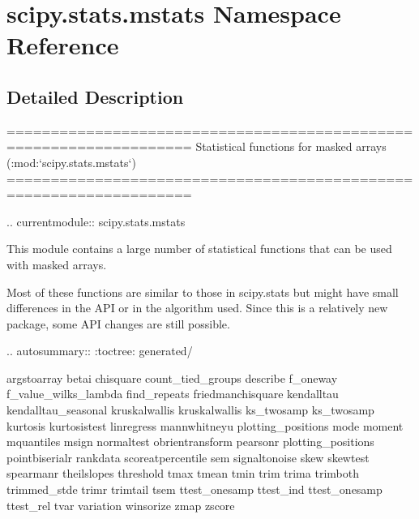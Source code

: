 \hypertarget{namespacescipy_1_1stats_1_1mstats}{}\section{scipy.\+stats.\+mstats Namespace Reference}
\label{namespacescipy_1_1stats_1_1mstats}


\subsection{Detailed Description}
\begin{DoxyVerb}===================================================================
Statistical functions for masked arrays (:mod:`scipy.stats.mstats`)
===================================================================

.. currentmodule:: scipy.stats.mstats

This module contains a large number of statistical functions that can
be used with masked arrays.

Most of these functions are similar to those in scipy.stats but might
have small differences in the API or in the algorithm used. Since this
is a relatively new package, some API changes are still possible.

.. autosummary::
   :toctree: generated/

   argstoarray
   betai
   chisquare
   count_tied_groups
   describe
   f_oneway
   f_value_wilks_lambda
   find_repeats
   friedmanchisquare
   kendalltau
   kendalltau_seasonal
   kruskalwallis
   kruskalwallis
   ks_twosamp
   ks_twosamp
   kurtosis
   kurtosistest
   linregress
   mannwhitneyu
   plotting_positions
   mode
   moment
   mquantiles
   msign
   normaltest
   obrientransform
   pearsonr
   plotting_positions
   pointbiserialr
   rankdata
   scoreatpercentile
   sem
   signaltonoise
   skew
   skewtest
   spearmanr
   theilslopes
   threshold
   tmax
   tmean
   tmin
   trim
   trima
   trimboth
   trimmed_stde
   trimr
   trimtail
   tsem
   ttest_onesamp
   ttest_ind
   ttest_onesamp
   ttest_rel
   tvar
   variation
   winsorize
   zmap
   zscore\end{DoxyVerb}
 